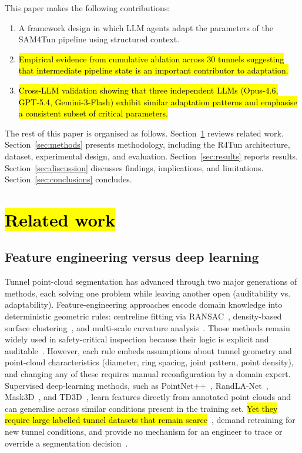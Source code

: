 \documentclass[a4paper,fleqn]{cas-dc}
\begin{document}
This paper makes the following contributions:
\begin{enumerate}
\item A framework design in which LLM agents adapt the parameters of the SAM4Tun pipeline using structured context.
\item \hl{Empirical evidence from cumulative ablation across 30 tunnels suggesting that intermediate pipeline state is an important contributor to adaptation.}
\item \hl{Cross-LLM validation showing that three independent LLMs (Opus-4.6, GPT-5.4, Gemini-3-Flash) exhibit similar adaptation patterns and emphasise a consistent subset of critical parameters.}
\end{enumerate}

The rest of this paper is organised as follows. Section~\ref{sec:related} reviews related work. Section~\ref{sec:methods} presents methodology, including the R4Tun architecture, dataset, experimental design, and evaluation. Section~\ref{sec:results} reports results. Section~\ref{sec:discussion} discusses findings, implications, and limitations. Section~\ref{sec:conclusions} concludes.

\section{\hl{Related work}}\label{sec:related}

\subsection{Feature engineering versus deep learning}

Tunnel point-cloud segmentation has advanced through two major generations of methods, each solving one problem while leaving another open (auditability vs. adaptability). Feature-engineering approaches encode domain knowledge into deterministic geometric rules: centreline fitting via RANSAC~\cite{fischler1981ransac}, density-based surface clustering~\cite{ester1996dbscan}, and multi-scale curvature analysis~\cite{pauly2002}. Those methods remain widely used in safety-critical inspection because their logic is explicit and auditable~\cite{weidner2024generalized}. However, each rule embeds assumptions about tunnel geometry and point-cloud characteristics (diameter, ring spacing, joint pattern, point density), and changing any of these requires manual reconfiguration by a domain expert. Supervised deep-learning methods, such as PointNet++~\cite{qi2017pointnet}, RandLA-Net~\cite{hu2020randla}, Mask3D~\cite{schult2023mask3d}, and TD3D~\cite{kolodiazhnyi2024td3d}, learn features directly from annotated point clouds and can generalise across similar conditions present in the training set. \hl{Yet they require large labelled tunnel datasets that remain scarce}~\cite{su2024review}, demand retraining for new tunnel conditions, and provide no mechanism for an engineer to trace or override a segmentation decision~\cite{cha2024deep}.
\end{document}

